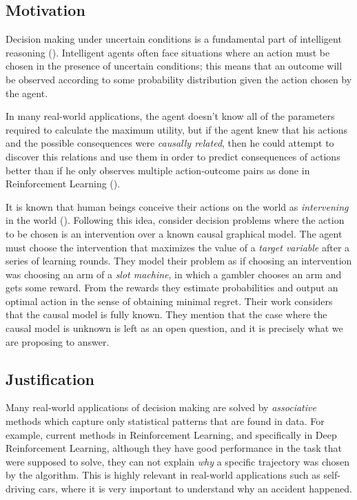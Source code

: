 \documentclass[11pt]{article}
\theoremstyle{plain}
\begin{document}
	\subsection{Motivation}
	Decision making under uncertain conditions is a fundamental part of intelligent reasoning (\cite{lake2017building}). Intelligent agents often face situations where an action must be chosen in the presence of uncertain conditions; this means that an outcome will be observed according to some probability distribution given the action chosen by the agent.
	
	In many real-world applications, the agent doesn't know all of the parameters required to calculate the maximum utility, but if the agent knew that his actions and the possible consequences were \textit{causally related}, then he could attempt to discover this relations and use them in order to predict consequences of actions better than if he only observes multiple action-outcome pairs as done in Reinforcement Learning (\cite{sutton1998reinforcement}). 
	
	It is known that human beings conceive their actions on the world as \textit{intervening} in the world (\cite{hagmayer2009decision}). Following this idea, \cite{lattimoreNIPS2016} consider decision problems where the action to be chosen is an intervention over a known causal graphical model. The agent must choose the intervention that maximizes the value of a \textit{target variable} after a series of learning rounds. They model their problem as if choosing an intervention was choosing an arm of a \textit{slot machine}, in which a gambler chooses an arm and gets some reward. From the rewards they estimate probabilities and output an optimal action in the sense of obtaining minimal regret. Their work considers that the causal model is fully known. They mention that the case where the causal model is unknown is left as an open question, and it is precisely what we are proposing to answer. 
	\subsection{Justification}
	Many real-world applications of decision making are solved by \textit{associative} methods which capture only statistical patterns that are found in data. For example, current methods in Reinforcement Learning, and specifically in Deep Reinforcement Learning, although they have good performance in the task that were supposed to solve, they can not explain \textit{why} a specific trajectory was chosen by the algorithm. This is highly relevant in real-world applications such as self-driving cars, where it is very important to understand why an accident happened. 
	
\end{document}
